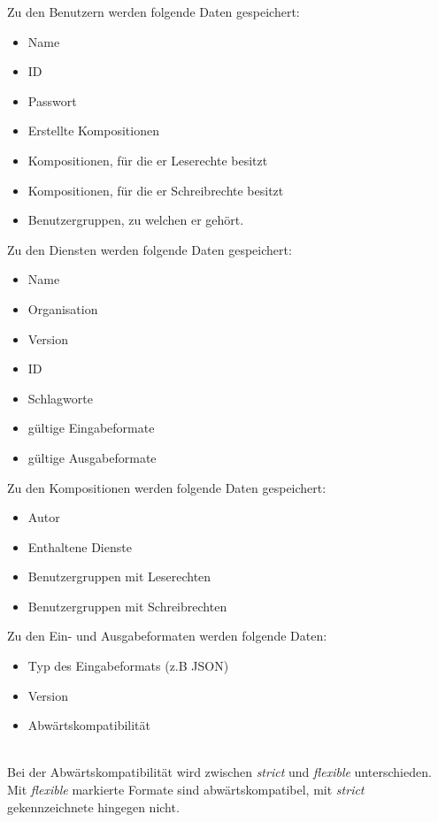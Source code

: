 Zu den Benutzern werden folgende Daten gespeichert:
\begin{itemize}
	\item Name
	\item ID
	\item Passwort
	\item Erstellte Kompositionen
	\item Kompositionen, für die er Leserechte besitzt
	\item Kompositionen, für die er Schreibrechte besitzt
	\item Benutzergruppen, zu welchen er gehört.
\end{itemize}
Zu den Diensten werden folgende Daten gespeichert:
\begin{itemize}
	\item Name
	\item Organisation
	\item Version
	\item ID
	\item Schlagworte
	\item gültige Eingabeformate
	\item gültige Ausgabeformate
\end{itemize}
Zu den Kompositionen werden folgende Daten gespeichert:
\begin{itemize}
	\item Autor
	\item Enthaltene Dienste
	\item Benutzergruppen mit Leserechten
	\item Benutzergruppen mit Schreibrechten
\end{itemize}

Zu den Ein- und Ausgabeformaten werden folgende Daten:
\begin{itemize}
	\item Typ des Eingabeformats (z.B JSON)
	\item Version
	\item Abwärtskompatibilität
\end{itemize}
\\Bei der Abwärtskompatibilität wird zwischen \textit{strict} und \textit{flexible} unterschieden. Mit \textit{flexible} markierte Formate sind abwärtskompatibel, mit \textit{strict} gekennzeichnete hingegen nicht.
